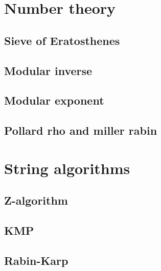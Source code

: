 \documentclass[a4paper,10pt]{article}
\begin{document}
\pagestyle{fancy}
\chead{}
\rhead{\thepage}
\lfoot{}
\cfoot{}
\rfoot{}

\twocolumn

\tableofcontents
\newpage
\section{Number theory}
%
\subsection{Sieve of Eratosthenes}

\subsection{Modular inverse}

\subsection{Modular exponent}

%
\subsection{Pollard rho and miller rabin}

\newpage
\section{String algorithms}
\subsection{Z-algorithm}

\subsection{KMP}

\subsection{Rabin-Karp}

\end{document}
